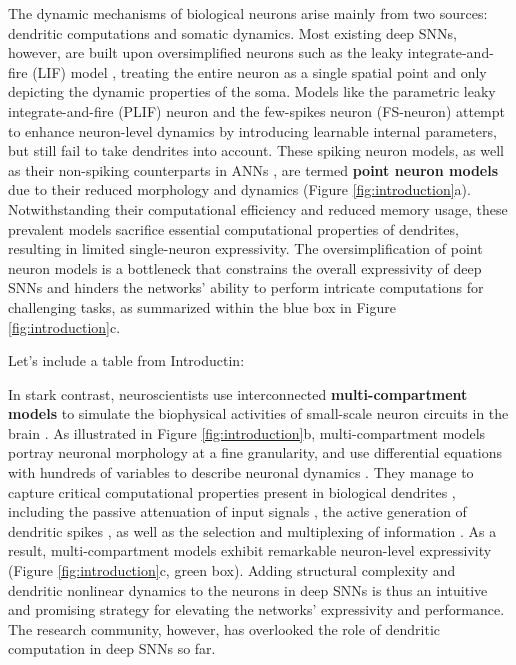 The dynamic mechanisms of biological neurons arise mainly from two sources: dendritic computations and somatic dynamics. Most existing deep SNNs, however, are built upon oversimplified neurons such as the leaky integrate-and-fire (LIF) model \cite{lapicque1907lif}, treating the entire neuron as a single spatial point and only depicting the dynamic properties of the soma. Models like the parametric leaky integrate-and-fire (PLIF) neuron \cite{fang2020plif} and the few-spikes neuron (FS-neuron) \cite{stockl2021optimized} attempt to enhance neuron-level dynamics by introducing learnable internal parameters, but still fail to take dendrites into account. These spiking neuron models, as well as their non-spiking counterparts in ANNs \cite{sanger1958perceptron}, are termed \textbf{point neuron models} due to their reduced morphology and dynamics (Figure \ref{fig:introduction}a). Notwithstanding their computational efficiency and reduced memory usage, these prevalent models sacrifice essential computational properties of dendrites, resulting in limited single-neuron expressivity. The oversimplification of point neuron models is a bottleneck that constrains the overall expressivity of deep SNNs and hinders the networks' ability to perform intricate computations for challenging tasks, as summarized within the blue box in Figure \ref{fig:introduction}c. 

Let's include a table from Introductin:


In stark contrast, neuroscientists use interconnected \textbf{multi-compartment models} to simulate the biophysical activities of small-scale neuron circuits in the brain \cite{hines2001NEURON,stimberg2019Brian2}. As illustrated in Figure \ref{fig:introduction}b, multi-compartment models portray neuronal morphology at a fine granularity, and use differential equations with hundreds of variables to describe neuronal dynamics \cite{poirazi2003arithmetic,schutter1994purkinje,hay2011pyramidal}. They manage to capture critical computational properties present in biological dendrites \cite{london2005dendritic,payeur2019dendriticinfo,acharya2022dendritic}, including the passive attenuation of input signals \cite{mengual2020dendsoma}, the active generation of dendritic spikes \cite{major2013active}, as well as the selection and multiplexing of information \cite{payeur2019dendriticinfo}. As a result, multi-compartment models exhibit remarkable neuron-level expressivity (Figure \ref{fig:introduction}c, green box). Adding structural complexity and dendritic nonlinear dynamics to the neurons in deep SNNs is thus an intuitive and promising strategy for elevating the networks' expressivity and performance. The research community, however, has overlooked the role of dendritic computation in deep SNNs so far.

